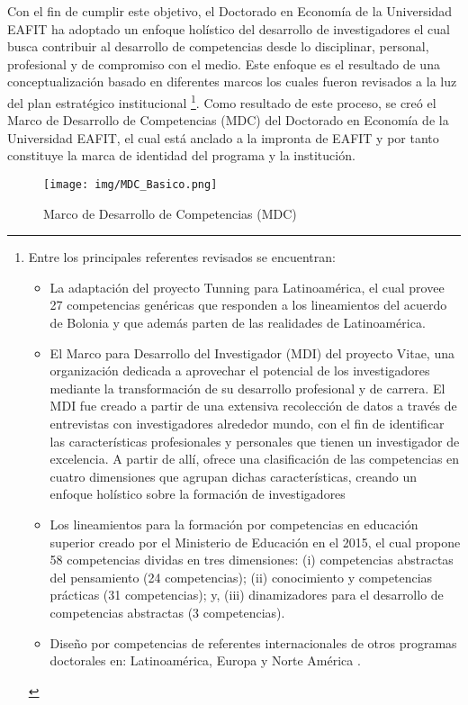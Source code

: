 Con el fin de cumplir este objetivo, el Doctorado en Economía de la Universidad EAFIT ha adoptado un enfoque holístico del desarrollo de investigadores el cual busca contribuir al desarrollo de competencias desde lo disciplinar, personal, profesional y de compromiso con el medio. Este enfoque es el resultado de una conceptualización basado en diferentes marcos los cuales fueron revisados a la luz del plan estratégico institucional
\footnote{Entre los principales referentes revisados se encuentran: 
\begin{itemize}
    \item La adaptación del proyecto Tunning para Latinoamérica, el cual provee 27 competencias genéricas que responden a los lineamientos del acuerdo de Bolonia y que además parten de las realidades de Latinoamérica. 
    \item El Marco para Desarrollo del Investigador (MDI) del proyecto Vitae, una organización dedicada a aprovechar el potencial de los investigadores mediante la transformación de su desarrollo profesional y de carrera. El MDI fue creado a partir de una extensiva recolección de datos a través de entrevistas con investigadores alrededor mundo, con el fin de identificar las características profesionales y personales que tienen un investigador de excelencia. A partir de allí, ofrece una clasificación de las competencias en cuatro dimensiones que agrupan dichas características, creando un enfoque holístico sobre la formación de investigadores
    \item Los lineamientos para la formación por competencias en educación superior creado por el Ministerio de Educación en el 2015, el cual propone 58 competencias dividas en tres dimensiones: (i) competencias abstractas del pensamiento (24 competencias); (ii) conocimiento y competencias prácticas (31 competencias); y, (iii) dinamizadores para el desarrollo de competencias abstractas (3 competencias).
    \item Diseño por competencias de referentes internacionales de otros programas doctorales en: Latinoamérica, Europa y Norte América .
\end{itemize}}. Como resultado de este proceso, se creó el Marco de Desarrollo de Competencias (MDC) del Doctorado en Economía de la Universidad EAFIT, el cual está anclado a la impronta de EAFIT y por tanto constituye la marca de identidad del programa y la institución.  

\begin{figure}[H]
\caption{Marco de Desarrollo de Competencias (MDC) \label{map_result_2} }
\begin{center}
\texttt{[image: img/MDC\_Basico.png]}
\end{center}
\end{figure}

